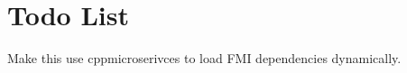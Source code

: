 \chapter{Todo List}
\hypertarget{todo}{}\label{todo}

\begin{DoxyRefList}
\item[File \doxylink{SimAdapterFactory_8hpp}{Sim\+Adapter\+Factory.hpp} ]\label{todo__todo000001}%
%
Make this use cppmicroserivces to load FMI dependencies dynamically. 
\end{DoxyRefList}